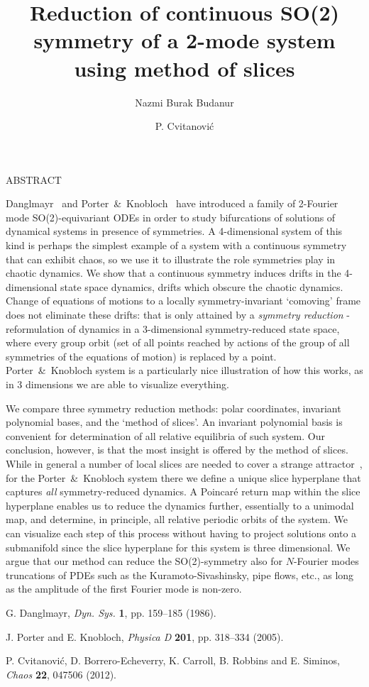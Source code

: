 \documentclass[11pt]{article}
\title{Reduction of continuous SO(2) symmetry of a 2-mode system using method of slices}
\date{}
\author[1]{Nazmi Burak Budanur}
\author[1]{P. Cvitanovi\'{c}}
\affil[1]{School of Physics and Center for Nonlinear Dynamics,
		  Georgia Inst. of Technology,
		  Atlanta, GA  30332, USA \emailaddress{budanur3@gatech.edu}}
\newcommand{\smalllineskip}{\baselineskip=15pt}
\renewenvironment{abstract}[0]{\small\rm
        \begin{center}ABSTRACT
        \\ \vspace{8pt}
        \begin{minipage}{5.2in}\smalllineskip
        \hspace{1pc}}{\end{minipage}\end{center}\vspace{-1pt}}
\begin{document}
\maketitle

\begin{abstract}

Danglmayr~\cite{Dang86} and Porter~\&\ Knobloch~\cite{PoKno05} have introduced a family of 2-Fourier mode SO(2)-equivariant ODEs  in order to study bifurcations of solutions of dynamical systems in presence of symmetries. A 4-dimensional system of this kind is perhaps the simplest example of a system with a continuous symmetry that can exhibit chaos, so we use it to illustrate the role symmetries play in chaotic dynamics. We show that a continuous symmetry induces drifts in the 4-dimensional state space dynamics, drifts which obscure the chaotic dynamics. Change of equations of motions to a locally symmetry-invariant `comoving' frame does not eliminate these drifts: that is only attained by a \emph{symmetry reduction} - reformulation of dynamics in a 3-dimensional symmetry-reduced state space, where every group orbit (set of all points reached by actions of the group of all symmetries of the equations of motion) is replaced by a point. Porter~\&\ Knobloch system is a particularly nice illustration of how this works, as in 3 dimensions we are able to visualize everything.

We compare three symmetry reduction methods: polar coordinates, invariant polynomial bases, and the `method of slices'. An invariant polynomial basis is convenient for determination of all relative equilibria of such system. Our conclusion, however, is that the most insight is offered by the method of slices. While in general a number of local slices are needed to cover a strange attractor~\cite{atlas12}, for the Porter~\&\ Knobloch system there we define a unique slice hyperplane that captures \emph{all} symmetry-reduced dynamics. A Poincar\'e return map within the slice hyperplane enables us to reduce the dynamics further, essentially to a unimodal map, and determine, in principle, all relative periodic orbits of the system. We can visualize each step of this process without having to project solutions onto a submanifold since the slice hyperplane for this system is three dimensional. We argue that our method can reduce the SO(2)-symmetry also for $N$-Fourier modes truncations of PDEs such as the Kuramoto-Sivashinsky, pipe flows, etc., as long as the amplitude of the first Fourier mode is non-zero.

\end{abstract}

\begin{thebibliography}{99}
\small

G. Danglmayr,  {\it Dyn. Sys.} {\bf 1}, pp. 159--185 (1986).

J. Porter and E. Knobloch, {\it Physica D} {\bf 201}, pp. 318--334 (2005).

P. Cvitanovi\'{c}, D. Borrero-Echeverry, K. Carroll, B. Robbins and
E. Siminos, {\it Chaos} {\bf 22}, 047506 (2012).

\end{thebibliography}
\end{document}
